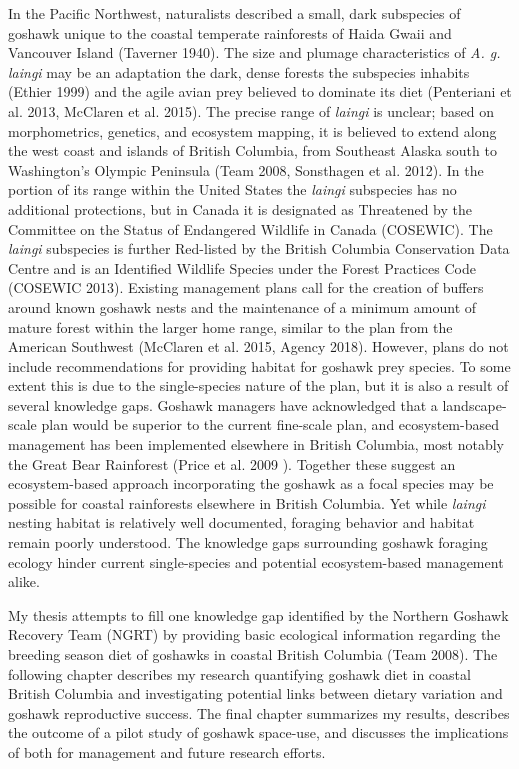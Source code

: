\documentclass{sfuthesis}
\begin{document}
In the Pacific Northwest, naturalists described a small, dark subspecies of goshawk unique to the coastal temperate rainforests of Haida Gwaii and Vancouver Island (Taverner 1940). The size and plumage characteristics of \emph{A. g. laingi} may be an adaptation the dark, dense forests the subspecies inhabits (Ethier 1999) and the agile avian prey believed to dominate its diet (Penteriani et al. 2013, McClaren et al. 2015). The precise range of \emph{laingi} is unclear; based on morphometrics, genetics, and ecosystem mapping, it is believed to extend along the west coast and islands of British Columbia, from Southeast Alaska south to Washington's Olympic Peninsula (Team 2008, Sonsthagen et al. 2012). In the portion of its range within the United States the \emph{laingi} subspecies has no additional protections, but in Canada it is designated as Threatened by the Committee on the Status of Endangered Wildlife in Canada (COSEWIC). The \emph{laingi} subspecies is further Red-listed by the British Columbia Conservation Data Centre and is an Identified Wildlife Species under the Forest Practices Code (COSEWIC 2013). Existing management plans call for the creation of buffers around known goshawk nests and the maintenance of a minimum amount of mature forest within the larger home range, similar to the plan from the American Southwest (McClaren et al. 2015, Agency 2018). However, plans do not include recommendations for providing habitat for goshawk prey species. To some extent this is due to the single-species nature of the plan, but it is also a result of several knowledge gaps. Goshawk managers have acknowledged that a landscape-scale plan would be superior to the current fine-scale plan, and ecosystem-based management has been implemented elsewhere in British Columbia, most notably the Great Bear Rainforest (Price et al. 2009 ). Together these suggest an ecosystem-based approach incorporating the goshawk as a focal species may be possible for coastal rainforests elsewhere in British Columbia. Yet while \emph{laingi} nesting habitat is relatively well documented, foraging behavior and habitat remain poorly understood. The knowledge gaps surrounding goshawk foraging ecology hinder current single-species and potential ecosystem-based management alike.

My thesis attempts to fill one knowledge gap identified by the Northern Goshawk Recovery Team (NGRT) by providing basic ecological information regarding the breeding season diet of goshawks in coastal British Columbia (Team 2008). The following chapter describes my research quantifying goshawk diet in coastal British Columbia and investigating potential links between dietary variation and goshawk reproductive success. The final chapter summarizes my results, describes the outcome of a pilot study of goshawk space-use, and discusses the implications of both for management and future research efforts.
\end{document}
